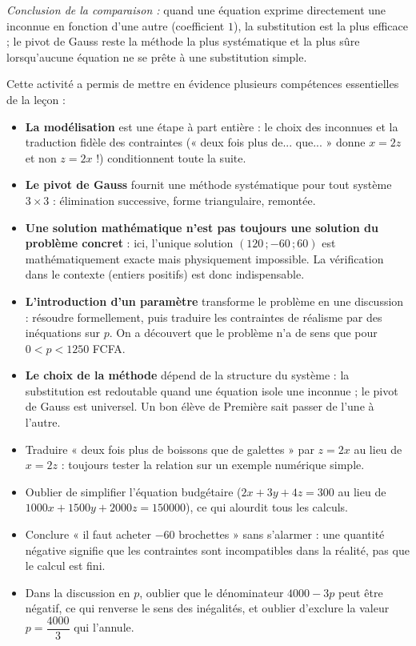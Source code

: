 \documentclass[11pt]{article}
\newcounter{popsec}
\newcounter{popsub}
\newcommand{\courssub}[1]{%
  \stepcounter{popsub}%
  \par\vspace{9pt}\noindent{\popxbold\fontsize{11.5}{13}\selectfont\color{popink}{\color{poporange}\thepopsec.\thepopsub}\hspace{6pt}#1}\par\nopagebreak\vspace{4pt}
}
\begin{document}
\begin{exoresolu}
\emph{Conclusion de la comparaison :} quand une équation exprime directement une inconnue en fonction d'une autre (coefficient $1$), la substitution est la plus efficace ; le pivot de Gauss reste la méthode la plus systématique et la plus sûre lorsqu'aucune équation ne se prête à une substitution simple.
\end{exoresolu}

\courssub{Bilan de l'activité}

Cette activité a permis de mettre en évidence plusieurs compétences essentielles de la leçon :
\begin{itemize}
\item \textbf{La modélisation} est une étape à part entière : le choix des inconnues et la traduction fidèle des contraintes (« deux fois plus de... que... » donne $x=2z$ et non $z=2x$ !) conditionnent toute la suite.
\item \textbf{Le pivot de Gauss} fournit une méthode systématique pour tout système $3\times 3$ : élimination successive, forme triangulaire, remontée.
\item \textbf{Une solution mathématique n'est pas toujours une solution du problème concret} : ici, l'unique solution $(120\,;-60\,;60)$ est mathématiquement exacte mais physiquement impossible. La vérification dans le contexte (entiers positifs) est donc indispensable.
\item \textbf{L'introduction d'un paramètre} transforme le problème en une discussion : résoudre formellement, puis traduire les contraintes de réalisme par des inéquations sur $p$. On a découvert que le problème n'a de sens que pour $0<p<1250$ FCFA.
\item \textbf{Le choix de la méthode} dépend de la structure du système : la substitution est redoutable quand une équation isole une inconnue ; le pivot de Gauss est universel. Un bon élève de Première sait passer de l'une à l'autre.
\end{itemize}

\begin{attention}
\begin{itemize}
\item Traduire « deux fois plus de boissons que de galettes » par $z=2x$ au lieu de $x=2z$ : toujours tester la relation sur un exemple numérique simple.
\item Oublier de simplifier l'équation budgétaire ($2x+3y+4z=300$ au lieu de $1000x+1500y+2000z=150000$), ce qui alourdit tous les calculs.
\item Conclure « il faut acheter $-60$ brochettes » sans s'alarmer : une quantité négative signifie que les contraintes sont incompatibles dans la réalité, pas que le calcul est fini.
\item Dans la discussion en $p$, oublier que le dénominateur $4000-3p$ peut être négatif, ce qui renverse le sens des inégalités, et oublier d'exclure la valeur $p=\dfrac{4000}{3}$ qui l'annule.
\end{itemize}
\end{attention}
\end{document}
